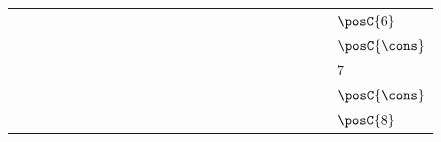 {\begin{tabular}{ccccccccccccccccccccccc|l}
\gcell{$$} & \gcell{$\posC{\circ}$} & \gcell{$\posC{\circ}$} & \gcell{$\posC{\circ}$} & \gcell{$\posC{\circ}$} & \cellcolor{blue!10}\gcell{$\posC{\circ}$} & \gcell{$\posC{\circ}$} & \gcell{$$} & \gcell{$$} & \gcell{$$} & \gcell{$\posC{\circ}$} & \gcell{$\posC{\circ}$} & \gcell{$\posC{\circ}$} & \gcell{$\posC{\circ}$} & \gcell{$\posC{\circ}$} & \gcell{$\posC{\circ}$} & \gcell{$\posC{\circ}$} & \gcell{$\posD{\bullet}$} & \gcell{$\posC{\circ}$} & \gcell{$$} & \gcell{$$} & \gcell{$$} & \gcell{$$} & \cellcolor{blue!10}$\posC{6}$ \\
\gcell{$$} & \gcell{$\posC{\circ}$} & \gcell{$\posC{\circ}$} & \gcell{$\posC{\circ}$} & \gcell{$\posC{\circ}$} & \cellcolor{blue!10}\gcell{$\posC{\circ}$} & \gcell{$\posC{\circ}$} & \gcell{$$} & \gcell{$$} & \gcell{$$} & \gcell{$\posC{\circ}$} & \gcell{$\posC{\circ}$} & \gcell{$\posC{\circ}$} & \gcell{$\posC{\circ}$} & \gcell{$\posC{\circ}$} & \gcell{$\posC{\circ}$} & \gcell{$\posC{\circ}$} & \gcell{$\posC{\circ}$} & \gcell{$\posC{\circ}$} & \gcell{$$} & \gcell{$$} & \gcell{$$} & \gcell{$$} & \cellcolor{blue!10}$\posC{\cons}$ \\
\gcell{$$} & \gcell{$\posC{\circ}$} & \gcell{$\posC{\circ}$} & \gcell{$\posC{\circ}$} & \gcell{$\posC{\circ}$} & \cellcolor{blue!10}\gcell{$\posD{\bullet}$} & \gcell{$\posC{\circ}$} & \gcell{$$} & \gcell{$$} & \gcell{$$} & \gcell{$\posC{\circ}$} & \gcell{$\posC{\circ}$} & \gcell{$\posC{\circ}$} & \gcell{$\posC{\circ}$} & \gcell{$\posC{\circ}$} & \gcell{$\posC{\circ}$} & \gcell{$\posC{\circ}$} & \gcell{$\posC{\circ}$} & \gcell{$\posC{\circ}$} & \gcell{$\posC{\circ}$} & \gcell{$\posC{\circ}$} & \gcell{$$} & \gcell{$$} & \cellcolor{blue!10}$7$ \\
\gcell{$$} & \gcell{$\posC{\circ}$} & \gcell{$\posC{\circ}$} & \gcell{$\posC{\circ}$} & \gcell{$\posC{\circ}$} & \cellcolor{blue!10}\gcell{$\posC{\circ}$} & \gcell{$\posC{\circ}$} & \gcell{$$} & \gcell{$$} & \gcell{$$} & \gcell{$\posC{\circ}$} & \gcell{$\posC{\circ}$} & \gcell{$\posC{\circ}$} & \gcell{$\posC{\circ}$} & \gcell{$\posC{\circ}$} & \gcell{$\posC{\circ}$} & \gcell{$\posC{\circ}$} & \gcell{$\posC{\circ}$} & \gcell{$\posC{\circ}$} & \gcell{$\posC{\circ}$} & \gcell{$\posC{\circ}$} & \gcell{$$} & \gcell{$$} & \cellcolor{blue!10}$\posC{\cons}$ \\
\gcell{$$} & \gcell{$\posC{\circ}$} & \gcell{$\posC{\circ}$} & \gcell{$\posC{\circ}$} & \gcell{$\posC{\circ}$} & \cellcolor{blue!10}\gcell{$\posC{\circ}$} & \gcell{$\posC{\circ}$} & \gcell{$\posD{\bullet}$} & \gcell{$\posC{\circ}$} & \gcell{$$} & \gcell{$\posC{\circ}$} & \gcell{$\posC{\circ}$} & \gcell{$\posC{\circ}$} & \gcell{$\posC{\circ}$} & \gcell{$\posC{\circ}$} & \gcell{$\posC{\circ}$} & \gcell{$\posC{\circ}$} & \gcell{$\posC{\circ}$} & \gcell{$\posC{\circ}$} & \gcell{$\posC{\circ}$} & \gcell{$\posC{\circ}$} & \gcell{$$} & \gcell{$$} & \cellcolor{blue!10}$\posC{8}$ \\

\end{tabular}}
